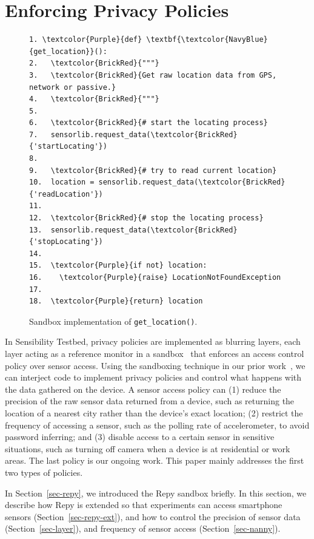 \section{Enforcing Privacy Policies}\label{sec-policy}

\begin{figure}
\begin{Verbatim}
1. \textcolor{Purple}{def} \textbf{\textcolor{NavyBlue}{get_location}}():
2.   \textcolor{BrickRed}{"""}
3.   \textcolor{BrickRed}{Get raw location data from GPS, network or passive.}
4.   \textcolor{BrickRed}{"""}
5. 
6.   \textcolor{BrickRed}{# start the locating process} 
7.   sensorlib.request_data(\textcolor{BrickRed}{'startLocating'})
8.
9.   \textcolor{BrickRed}{# try to read current location}
10.  location = sensorlib.request_data(\textcolor{BrickRed}{'readLocation'})
11.
12.  \textcolor{BrickRed}{# stop the locating process} 
13.  sensorlib.request_data(\textcolor{BrickRed}{'stopLocating'})
14.
15.  \textcolor{Purple}{if not} location:
16.    \textcolor{Purple}{raise} LocationNotFoundException    
17.  
18.  \textcolor{Purple}{return} location
\end{Verbatim}
\caption{\small Sandbox implementation of \texttt{get\_location()}. 
\label{fig-getlocation}}
\end{figure}

In Sensibility Testbed, privacy policies are implemented as blurring layers, each layer acting as a 
reference monitor in a sandbox~\cite{ref} that enforces an access 
control policy over sensor access. Using the sandboxing 
technique in our prior work~\cite{cappos2010retaining}, we can 
interject code to implement privacy policies and control what 
happens with the data gathered on the device. A sensor access 
policy can (1) reduce 
the precision of the raw sensor data returned from a device, such
as returning the location of a nearest city rather than the device's exact location; (2) restrict 
the frequency of accessing a sensor, such as the polling rate of 
accelerometer, to avoid password inferring; and (3) disable  
access to a certain sensor in sensitive situations, such as 
turning off camera when a device is at residential or work areas.
The last policy is our ongoing work. This paper mainly addresses
the first two types of policies. 

In Section~\ref{sec-repy}, we introduced the Repy sandbox briefly. 
In this section, we describe how Repy is extended so that experiments
can access smartphone sensors (Section~\ref{sec-repy-ext}), and 
how to control the precision of sensor data (Section~\ref{sec-layer}), 
and frequency of sensor access (Section~\ref{sec-nanny}).

